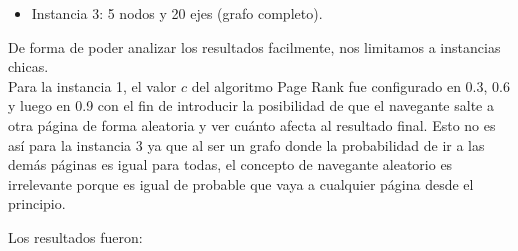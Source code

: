 \begin{itemize}
\begin{center}
        \end{center}
    \item Instancia 3: 5 nodos y 20 ejes (grafo completo).
        \begin{center}
        \end{center}
\end{itemize}
De forma de poder analizar los resultados facilmente, nos limitamos a instancias chicas.\\

Para la instancia 1, el valor $c$ del algoritmo Page Rank fue configurado en 0.3, 0.6 y luego en 0.9 con el fin de introducir la posibilidad de que el navegante salte a otra página de forma aleatoria y ver cuánto afecta al resultado final. Esto no es así para la instancia 3 ya que al ser un grafo donde la probabilidad de ir a las demás páginas es igual para todas, el concepto de navegante aleatorio es irrelevante porque es igual de probable que vaya a cualquier página desde el principio.

Los resultados fueron:

